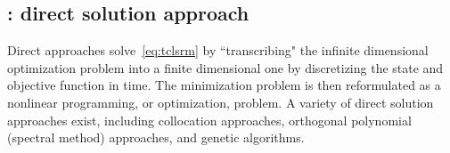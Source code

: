 \subsection{\spatialAcronym: direct solution approach}\label{sec:direct} 

Direct approaches solve~\eqref{eq:tclsrm} by
``transcribing" the infinite dimensional optimization problem into a finite
dimensional one by discretizing the state and objective function in time.
The minimization problem is then reformulated as a nonlinear programming, or
optimization, problem. A variety of direct solution approaches exist, 
including collocation approaches, orthogonal polynomial (spectral  method) 
approaches, and genetic algorithms.  
  

